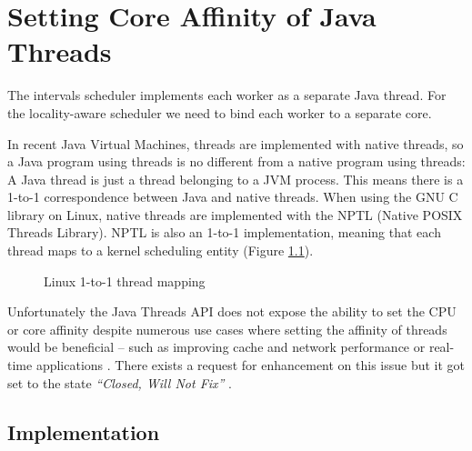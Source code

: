
\chapter{Setting Core Affinity of Java Threads}
\label{chap:appendix-core-affinity}

The intervals scheduler implements each worker as a separate Java
thread. For the locality-aware scheduler we need to bind each worker
to a separate core.

In recent Java Virtual Machines, threads are implemented with native
threads, so a Java program using threads is no different from a native
program using threads: A Java thread is just a thread belonging to a
JVM process. This means there is a 1-to-1 correspondence between Java
and native threads. When using the GNU C library on Linux, native
threads are implemented with the NPTL (Native POSIX Threads
Library). NPTL is also an 1-to-1 implementation, meaning that each
thread maps to a kernel scheduling entity (Figure
\ref{fig:core-affinity-thread-mapping}).

\begin{figure}[htb]
  \centering
  \caption{Linux 1-to-1 thread mapping}
  \label{fig:core-affinity-thread-mapping}
\end{figure}

Unfortunately the Java Threads API does not expose the ability to set
the CPU or core affinity despite numerous use cases where setting the
affinity of threads would be beneficial -- such as improving cache and
network performance or real-time applications \cite{Love2003, Dow2005,
  Foong2008}. There exists a request for enhancement on this issue but
it got set to the state \emph{``Closed, Will Not Fix''}
\cite{Oracle1999}.


\section{Implementation}
\label{sec:appendix-core-affinity-implementation}

